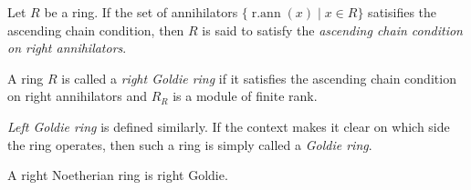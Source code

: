 \documentclass[12pt]{article}
\DeclareMathOperator{\rann}{r.ann}
\begin{document}
Let $R$ be a ring.  If the set of annihilators
$\{ \rann(x) \mid x \in R\}$
satisifies the ascending chain condition, then
$R$ is said to satisfy the \emph{ascending chain condition on right annihilators}.

A ring $R$ is called a \emph{right Goldie ring} if it satisfies the ascending chain condition on right annihilators and $R_R$ is a module of finite rank.

\emph{Left Goldie ring} is defined similarly.  If the context makes it clear on which side the ring operates, then such a ring is simply called a \emph{Goldie ring}.

A right Noetherian ring is right Goldie.
\end{document}
